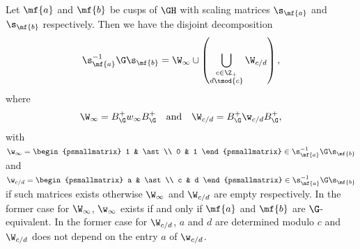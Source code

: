 \documentclass[12pt]{article}
\begin{document}
      \begin{theorem*}
        Let \(\mf{a}\) and \(\mf{b}\) be cusps of \(\GH\) with scaling matrices \(\s_{\mf{a}}\) and \(\s_{\mf{b}}\) respectively. Then we have the disjoint decomposition
        \[
          \s_{\mf{a}}^{-1}\G\s_{\mf{b}} = \W_{\infty} \cup \left(\bigcup_{\substack{c \in \Z_{+} \\ d \tmod{c}}}\W_{c/d}\right),
        \]
        where
        \[
          \W_{\infty} = B_{\G}^{+}w_{\infty}B_{\G}^{+} \quad \text{and} \quad \W_{c/d} = B_{\G}^{+}\w_{c/d}B_{\G}^{+},
        \]
        with \(\w_{\infty} = \begin{psmallmatrix} 1 & \ast \\ 0 & 1 \end{psmallmatrix} \in \s_{\mf{a}}^{-1}\G\s_{\mf{b}}\) and \(\w_{c/d} = \begin{psmallmatrix} a & \ast \\ c & d \end{psmallmatrix} \in \s_{\mf{a}}^{-1}\G\s_{\mf{b}}\) if such matrices exists otherwise \(\W_{\infty}\) and \(\W_{c/d}\) are empty respectively. In the former case for \(\W_{\infty}\), \(\w_{\infty}\) exists if and only if \(\mf{a}\) and \(\mf{b}\) are \(\G\)-equivalent. In the former case for \(\W_{c/d}\), \(a\) and \(d\) are determined modulo \(c\) and \(\W_{c/d}\) does not depend on the entry \(a\) of \(\w_{c/d}\).
      \end{theorem*}
\end{document}
